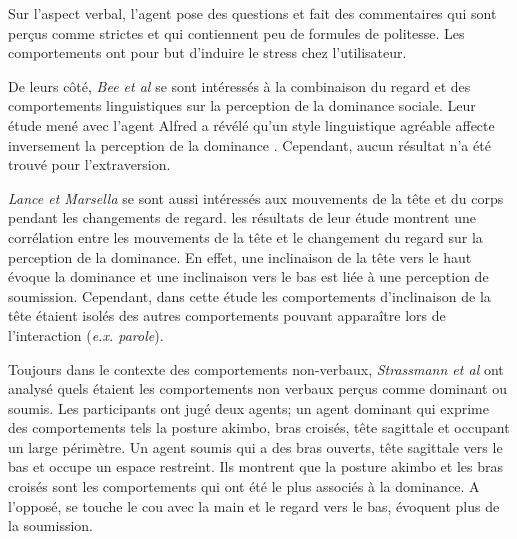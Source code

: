 		Sur l'aspect verbal, l'agent pose des questions et fait des commentaires qui sont perçus comme strictes et qui contiennent peu de formules de politesse. 
		 Les comportements ont pour but d'induire le stress chez l'utilisateur. 
		
		De leurs côté, \emph{Bee et al } \cite{bee2010bossy} se sont intéressés à la combinaison du regard et des comportements linguistiques sur la perception de la dominance sociale.  Leur étude mené avec l'agent Alfred a révélé qu'un style linguistique agréable affecte inversement la perception de la dominance \cite{bee2010bossy}. Cependant, aucun résultat n'a été trouvé pour l'extraversion.
		
		 \emph{Lance et Marsella} \cite{lance2008relation,lance2007emotionally} se sont aussi intéressés aux mouvements de la tête et du corps pendant les changements de regard. les résultats de leur étude montrent une corrélation entre les mouvements de la tête et le changement du regard sur la perception de la dominance. En effet, une inclinaison de la tête vers le haut évoque la dominance et une inclinaison vers le bas est liée à une perception de soumission. Cependant, dans cette étude les comportements d'inclinaison de la tête étaient isolés des autres comportements pouvant apparaître lors de l'interaction (\emph{e.x. parole}).
		
		Toujours dans le contexte des comportements non-verbaux, \emph{Strassmann et al} \cite{strassmann2016effect} ont analysé quels étaient les comportements non verbaux perçus comme dominant ou soumis. 
		Les participants ont jugé deux agents;  un agent dominant qui exprime des comportements tels la posture akimbo, bras croisés, tête sagittale et occupant un large périmètre. Un agent soumis qui a des bras ouverts, tête sagittale vers le bas et occupe un espace restreint.
		Ils montrent que la posture akimbo et les bras croisés sont les comportements qui ont été le plus associés à la dominance. A l'opposé, se touche le cou avec la main et le regard vers le bas, évoquent plus de la soumission. 
		
